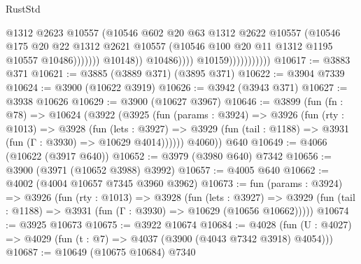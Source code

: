\begin{lexlean}{RustStd}
\begin{coremodule}
                                              @1312
                                              @2623
                                              @10557
                                              (@10546
                                                @602
                                                @20
                                                @63
                                                @1312
                                                @2622
                                                @10557
                                                (@10546
                                                  @175
                                                  @20
                                                  @22
                                                  @1312
                                                  @2621
                                                  @10557
                                                  (@10546
                                                    @100
                                                    @20
                                                    @11
                                                    @1312
                                                    @1195
                                                    @10557
                                                    @10486)))))))
                                      @10148))
                                  @10486))))
                          @10159)))))))))))
@10617 := @3883 @371
@10621 := @3885 (@3889 @371) (@3895 @371)
@10622 := @3904 @7339
@10624 := @3900 (@10622 @3919)
@10626 := @3942 (@3943 @371)
@10627 := @3938 @10626
@10629 := @3900 (@10627 @3967)
@10646 := @3899
    (fun (fn : @78) =>
    @10624
      (@3922
        (@3925
          (fun (params : @3924) =>
          @3926
            (fun (rty : @1013) =>
            @3928
              (fun (lets : @3927) =>
              @3929 (fun (tail : @1188) => @3931 (fun (Γ : @3930) => @10629 @4014))))))
        @4060))
    @640
@10649 := @4066 (@10622 (@3917 @640))
@10652 := @3979 (@3980 @640) @7342
@10656 := @3900 (@3971 (@10652 @3988) @3992)
@10657 := @4005 @640
@10662 := @4002 (@4004 @10657 @7345 @3960 @3962)
@10673 := fun (params : @3924) =>
  @3926
    (fun (rty : @1013) =>
    @3928
      (fun (lets : @3927) =>
      @3929 (fun (tail : @1188) => @3931 (fun (Γ : @3930) => @10629 (@10656 @10662)))))
@10674 := @3925 @10673
@10675 := @3922 @10674
@10684 := @4028 (fun (U : @4027) => @4029 (fun (t : @7) => @4037 (@3900 (@4043 @7342 @3918) @4054)))
@10687 := @10649 (@10675 @10684) @7340

\end{coremodule}
\end{lexlean}
